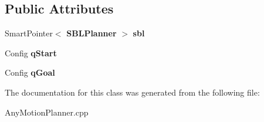 \subsection*{Public Attributes}
\begin{DoxyCompactItemize}
\item 
Smart\+Pointer$<$ {\bf S\+B\+L\+Planner} $>$ {\bfseries sbl}\label{classSBLInterface_a78bfe02e938e062c74c2c7b889495572}

\item 
Config {\bfseries q\+Start}\label{classSBLInterface_a4e1e581845aedcf21175c4b5c4d46645}

\item 
Config {\bfseries q\+Goal}\label{classSBLInterface_ae303831c29066d157859d56cdee6ea19}

\end{DoxyCompactItemize}


The documentation for this class was generated from the following file\+:\begin{DoxyCompactItemize}
\item 
Any\+Motion\+Planner.\+cpp\end{DoxyCompactItemize}
